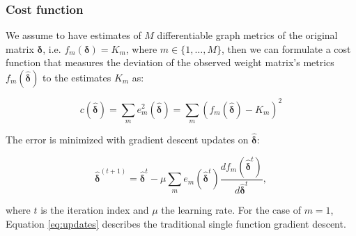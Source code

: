 \documentclass[12pt,a4paper,english]{article}
\begin{document}
\subsubsection{Cost function}
We assume to have estimates of $M$ differentiable graph metrics of the original matrix $\bm{\delta}$, i.e. $f_m(\bm{\delta}) = K_m$, where $m\in\{ 1,\dots, M \}$, then we can formulate a cost function that measures the deviation of the observed weight matrix's metrics $f_m(\bm{\hat{\delta}})$ to the estimates $K_m$ as: 

\begin{equation}
c(\bm{\hat{\delta}}) = \sum_m e_m^2(\bm{\hat{\delta}}) = \sum_m(f_m(\bm{\hat{\delta}})-K_m)^2
\end{equation}

The error is minimized with gradient descent updates on $\bm{\hat{\delta}}$: 

\begin{equation}
\bm{\hat{\delta}}^{(t+1)} = \bm{\hat{\delta}}^t-\mu\sum_m e_m(\bm{\hat{\delta}}^t)\frac{df_m(\bm{\hat{\delta}}^t)}{d\bm{\hat{\delta}}^t},
\label{eq:updates}
\end{equation}

where $t$ is the iteration index and $\mu$ the learning rate. For the case of $m=1$, Equation \ref{eq:updates} describes the traditional single function gradient descent. 
\end{document}
